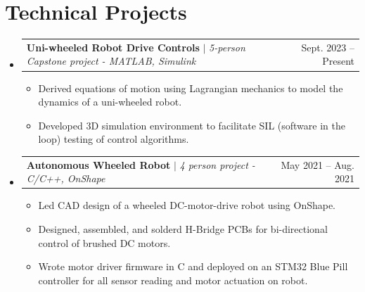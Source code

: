 \documentclass[letterpaper,11pt]{article}
\makeatletter
\newcommand{\resumeItem}[1]{
  \item\small{
    {#1 \vspace{-2pt}}
  }
}
\newcommand{\resumeProjectHeading}[2]{
    \item
    \begin{tabular*}{0.97\textwidth}{l@{\extracolsep{\fill}}r}
      \small#1 & #2 \\
    \end{tabular*}\vspace{-7pt}
}
\newcommand{\resumeSubHeadingListStart}{\begin{itemize}[leftmargin=0.15in, label={}]}
\newcommand{\resumeSubHeadingListEnd}{\end{itemize}}
\newcommand{\resumeItemListStart}{\begin{itemize}}
\newcommand{\resumeItemListEnd}{\end{itemize}\vspace{-5pt}}
\makeatother
\begin{document}
\section{Technical Projects}
    \resumeSubHeadingListStart
        \resumeProjectHeading
          {\textbf{Uni-wheeled Robot Drive Controls}
          $|$ \emph{5-person Capstone project - MATLAB, Simulink}
          }{Sept. 2023 -- Present}
          \resumeItemListStart
            \resumeItem{Derived equations of motion using Lagrangian mechanics to model the dynamics of a uni-wheeled robot.}
            \resumeItem{Developed 3D simulation environment to facilitate SIL (software in the loop) testing of control algorithms.}
          \resumeItemListEnd
      \resumeProjectHeading
          {\textbf{Autonomous Wheeled Robot}
          $|$ \emph{4 person project - C/C++, OnShape}
          }{May 2021 -- Aug. 2021}
          \resumeItemListStart
            \resumeItem{Led CAD design of a wheeled DC-motor-drive robot using OnShape.}
            \resumeItem{Designed, assembled, and solderd H-Bridge PCBs for bi-directional control of brushed DC motors.}
            \resumeItem{Wrote motor driver firmware in C and deployed on an STM32 Blue Pill controller for all sensor reading and motor actuation on robot.}
          \resumeItemListEnd
    \resumeSubHeadingListEnd
\end{document}
